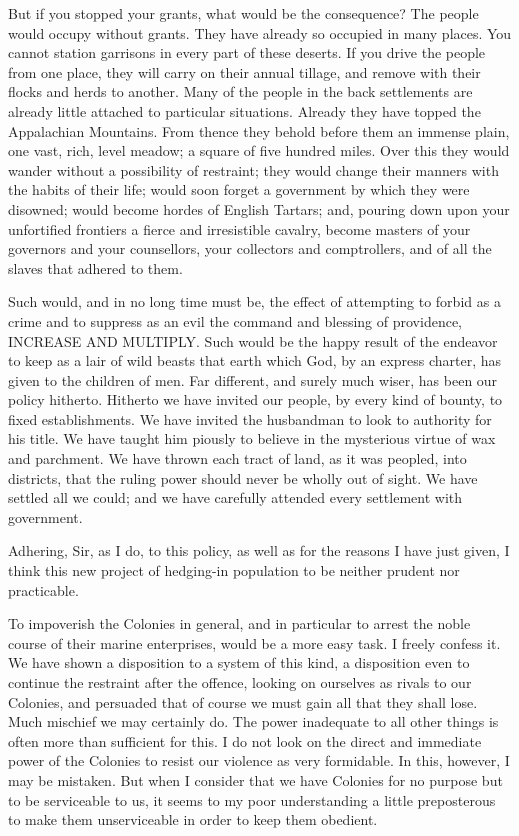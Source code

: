 But if you stopped your grants, what would be the consequence? The people would occupy without grants. They have already so occupied in many places. You cannot station garrisons in every part of these deserts. If you drive the people from one place, they will carry on their annual tillage, and remove with their flocks and herds to another. Many of the people in the back settlements are already little attached to particular situations. Already they have topped the Appalachian Mountains. From thence they behold before them an immense plain, one vast, rich, level meadow; a square of five hundred miles. Over this they would wander without a possibility of restraint; they would change their manners with the habits of their life; would soon forget a government by which they were disowned; would become hordes of English Tartars; and, pouring down upon your unfortified frontiers a fierce and irresistible cavalry, become masters of your governors and your counsellors, your collectors and comptrollers, and of all the slaves that adhered to them.\par

Such would, and in no long time must be, the effect of attempting to forbid as a crime and to suppress as an evil the command and blessing of providence, INCREASE AND MULTIPLY. Such would be the happy result of the endeavor to keep as a lair of wild beasts that earth which God, by an express charter, has given to the children of men. Far different, and surely much wiser, has been our policy hitherto. Hitherto we have invited our people, by every kind of bounty, to fixed establishments. We have invited the husbandman to look to authority for his title. We have taught him piously to believe in the mysterious virtue of wax and parchment. We have thrown each tract of land, as it was peopled, into districts, that the ruling power should never be wholly out of sight. We have settled all we could; and we have carefully attended every settlement with government.\par

Adhering, Sir, as I do, to this policy, as well as for the reasons I have just given, I think this new project of hedging-in population to be neither prudent nor practicable.\par

To impoverish the Colonies in general, and in particular to arrest the noble course of their marine enterprises, would be a more easy task. I freely confess it. We have shown a disposition to a system of this kind, a disposition even to continue the restraint after the offence, looking on ourselves as rivals to our Colonies, and persuaded that of course we must gain all that they shall lose. Much mischief we may certainly do. The power inadequate to all other things is often more than sufficient for this. I do not look on the direct and immediate power of the Colonies to resist our violence as very formidable. In this, however, I may be mistaken. But when I consider that we have Colonies for no purpose but to be serviceable to us, it seems to my poor understanding a little preposterous to make them unserviceable in order to keep them obedient.\par


